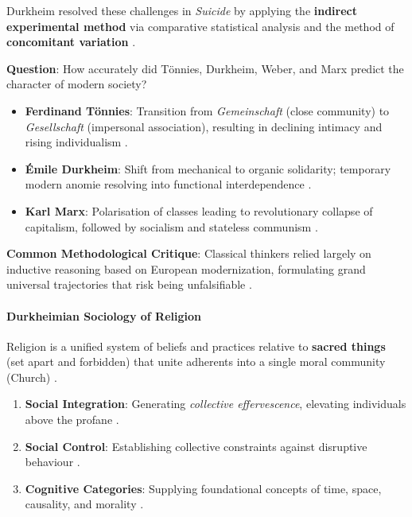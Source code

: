 \begin{CriticalPoint}
Durkheim resolved these challenges in \textit{Suicide} by applying the \textbf{indirect experimental method} via comparative statistical analysis and the method of \textbf{concomitant variation} .
\end{CriticalPoint}

\begin{PYQLink}
\textbf{Question}: How accurately did T\"onnies, Durkheim, Weber, and Marx predict the character of modern society? 
\end{PYQLink}

\begin{itemize}
    \item \textbf{Ferdinand T\"onnies}: Transition from \textit{Gemeinschaft} (close community) to \textit{Gesellschaft} (impersonal association), resulting in declining intimacy and rising individualism .
    \item \textbf{\'Emile Durkheim}: Shift from mechanical to organic solidarity; temporary modern anomie resolving into functional interdependence .
    \item \textbf{Karl Marx}: Polarisation of classes leading to revolutionary collapse of capitalism, followed by socialism and stateless communism .
\end{itemize}

\begin{CriticalPoint}
\textbf{Common Methodological Critique}: Classical thinkers relied largely on inductive reasoning based on European modernization, formulating grand universal trajectories that risk being unfalsifiable .
\end{CriticalPoint}

\paragraph{Durkheimian Sociology of Religion}
Religion is a unified system of beliefs and practices relative to \textbf{sacred things} (set apart and forbidden) that unite adherents into a single moral community (Church) .
\begin{enumerate}
    \item \textbf{Social Integration}: Generating \textit{collective effervescence}, elevating individuals above the profane .
    \item \textbf{Social Control}: Establishing collective constraints against disruptive behaviour .
    \item \textbf{Cognitive Categories}: Supplying foundational concepts of time, space, causality, and morality .
\end{enumerate}

